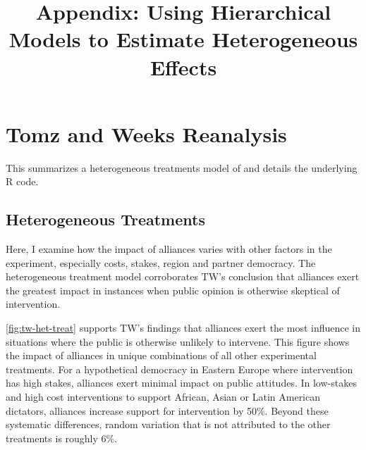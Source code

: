 \documentclass[12pt]{article}
\title{\textbf{Appendix: Using Hierarchical Models to Estimate Heterogeneous Effects}}
\date{}
\begin{document}
\maketitle 

\singlespace 

\tableofcontents



\section{Tomz and Weeks Reanalysis}

This summarizes a heterogeneous treatments model of \citep{TomzWeeks2021} and details the underlying \textsf{R} code. 

\subsection{Heterogeneous Treatments} 

Here, I examine how the impact of alliances varies with other factors in the experiment, especially costs, stakes, region and partner democracy.
The heterogeneous treatment model corroborates TW's conclusion that alliances exert the greatest impact in instances when public opinion is otherwise skeptical of intervention.

\autoref{fig:tw-het-treat} supports TW's findings that alliances exert the most influence in situations where the public is otherwise unlikely to intervene. 
This figure shows the impact of alliances in unique combinations of all other experimental treatments. 
For a hypothetical democracy in Eastern Europe where intervention has high stakes, alliances exert minimal impact on public attitudes. 
In low-stakes and high cost interventions to support African, Asian or Latin American dictators, alliances increase support for intervention by 50\%. 
Beyond these systematic differences, random variation that is not attributed to the other treatments is roughly 6\%. 
\end{document}
